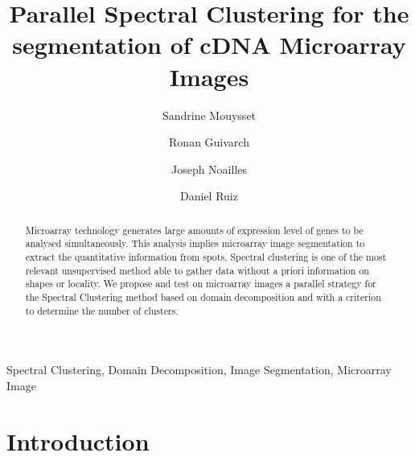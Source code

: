 \documentclass[runningheads,a4paper]{llncs}
\newcommand{\keywords}[1]{\par\addvspace\baselineskip
\noindent\keywordname\enspace\ignorespaces#1}
\begin{document}
\mainmatter

\title{Parallel Spectral Clustering for the segmentation of cDNA Microarray Images}


\author{Sandrine Mouysset \and Ronan Guivarch \and Joseph Noailles\and Daniel Ruiz}



\maketitle

\begin{abstract}
Microarray technology  generates large amounts of expression level of genes to
be analysed simultaneously.  This analysis implies microarray image
segmentation to extract the quantitative information from spots.  Spectral
clustering is one of the most relevant unsupervised method able to gather data
without a priori information on shapes or locality.  We propose  and test on
microarray images a parallel strategy for the Spectral Clustering method based
on domain decomposition and with  a criterion to determine the number of
clusters.
\end{abstract}



\keywords{Spectral Clustering, Domain Decomposition, Image Segmentation, Microarray Image} %

\section{Introduction}
\end{document}
